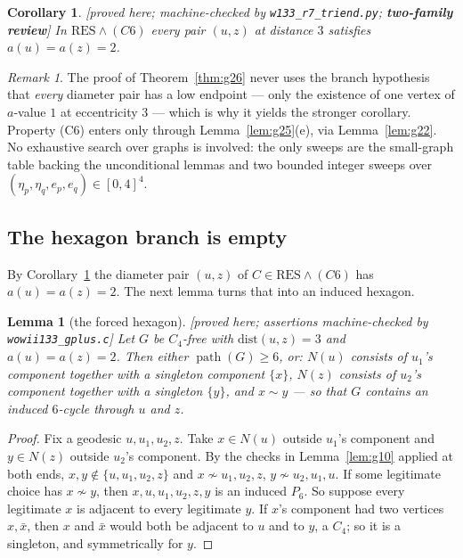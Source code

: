 \documentclass[11pt]{article}
\theoremstyle{plain}
\newtheorem{lemma}[theorem]{Lemma}
\newtheorem{corollary}[theorem]{Corollary}
\theoremstyle{definition}
\theoremstyle{remark}
\newtheorem{remark}[theorem]{Remark}
\numberwithin{equation}{section}
\newcommand{\pth}{\operatorname{path}}
\newcommand{\statusbox}[1]{{\small\sloppy\textsf{[#1]}}}
\newcommand{\PRV}[1]{\statusbox{proved here; assertions machine-checked by \texttt{#1}}}
\newcommand{\REV}[1]{\statusbox{proved here; machine-checked by \texttt{#1};
\textbf{two-family review}}}
\begin{document}
\begin{corollary}\label{cor:g26.1}
\REV{w133\_r7\_triend.py}
In $\mathrm{RES}\wedge(C6)$ every pair $(u,z)$ at distance $3$ satisfies $a(u)=a(z)=2$.
\end{corollary}

\begin{remark}
The proof of Theorem~\ref{thm:g26} never uses the branch hypothesis that \emph{every}
diameter pair has a low endpoint --- only the existence of one vertex of $a$-value $1$ at
eccentricity $3$ --- which is why it yields the stronger corollary. Property (C6) enters only
through Lemma~\ref{lem:g25}(e), via Lemma~\ref{lem:g22}. No exhaustive search over graphs is
involved: the only sweeps are the small-graph table backing the unconditional lemmas and two
bounded integer sweeps over $(\eta_p,\eta_q,e_p,e_q) \in [0,4]^4$.
\end{remark}

\subsection{The hexagon branch is empty}\label{sec:hexagon}

By Corollary~\ref{cor:g26.1} the diameter pair $(u,z)$ of $C \in \mathrm{RES}\wedge(C6)$ has
$a(u) = a(z) = 2$. The next lemma turns that into an induced hexagon.

\begin{lemma}[the forced hexagon]\label{lem:g13}
\PRV{wowii133\_gplus.c}
Let $G$ be $C_4$-free with $\mathrm{dist}(u,z) = 3$ and $a(u) = a(z) = 2$. Then either
$\pth(G)\ge 6$, or: $N(u)$ consists of $u_1$'s component together with a \emph{singleton}
component $\{x\}$, $N(z)$ consists of $u_2$'s component together with a singleton $\{y\}$,
and $x \sim y$ --- so that $G$ contains an induced $6$-cycle through $u$ and $z$.
\end{lemma}

\begin{proof}
Fix a geodesic $u, u_1, u_2, z$. Take $x \in N(u)$ outside $u_1$'s component and
$y \in N(z)$ outside $u_2$'s component. By the checks in Lemma~\ref{lem:g10} applied at both
ends, $x,y \notin \{u,u_1,u_2,z\}$ and $x \not\sim u_1,u_2,z$, $y \not\sim u_2,u_1,u$. If
some legitimate choice has $x\not\sim y$, then $x,u,u_1,u_2,z,y$ is an induced $P_6$. So
suppose every legitimate $x$ is adjacent to every legitimate $y$. If $x$'s component had two
vertices $x, \bar x$, then $x$ and $\bar x$ would both be adjacent to $u$ and to $y$, a
$C_4$; so it is a singleton, and symmetrically for $y$.
\end{proof}
\end{document}
